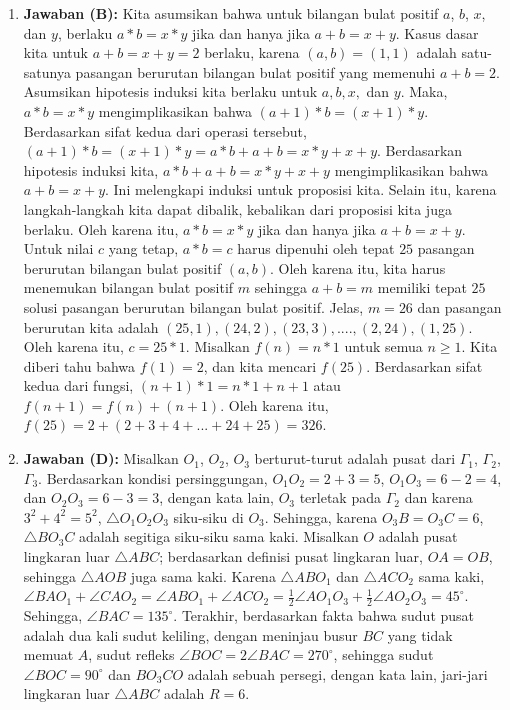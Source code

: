 \documentclass[12pt]{scrartcl}
\begin{document}
\begin{enumerate}
\item \textbf{Jawaban (B):} Kita asumsikan bahwa untuk bilangan bulat positif $a$, $b$, $x$, dan $y$, berlaku $a*b=x*y$ jika dan hanya jika $a+b=x+y$. Kasus dasar kita untuk $a+b=x+y=2$ berlaku, karena $(a,b)=(1,1)$ adalah satu-satunya pasangan berurutan bilangan bulat positif yang memenuhi $a+b=2$. Asumsikan hipotesis induksi kita berlaku untuk $a,b,x,$ dan $y$. Maka, $a*b=x*y$ mengimplikasikan bahwa $(a+1)*b=(x+1)*y$. Berdasarkan sifat kedua dari operasi tersebut, $(a+1)*b=(x+1)*y=a*b+a+b=x*y+x+y$. Berdasarkan hipotesis induksi kita, $a*b+a+b=x*y+x+y$ mengimplikasikan bahwa $a+b=x+y$. Ini melengkapi induksi untuk proposisi kita. Selain itu, karena langkah-langkah kita dapat dibalik, kebalikan dari proposisi kita juga berlaku. Oleh karena itu, $a*b=x*y$ jika dan hanya jika $a+b=x+y$. Untuk nilai $c$ yang tetap, $a*b=c$ harus dipenuhi oleh tepat $25$ pasangan berurutan bilangan bulat positif $(a, b)$. Oleh karena itu, kita harus menemukan bilangan bulat positif $m$ sehingga $a+b=m$ memiliki tepat $25$ solusi pasangan berurutan bilangan bulat positif. Jelas, $m=26$ dan pasangan berurutan kita adalah $(25,1), (24, 2), (23, 3), ...., (2, 24), (1, 25)$. Oleh karena itu, $c=25*1$. Misalkan $f(n)=n*1$ untuk semua $n\ge1$. Kita diberi tahu bahwa $f(1)=2$, dan kita mencari $f(25)$. Berdasarkan sifat kedua dari fungsi, $(n+1)*1=n*1+n+1$ atau $f(n+1)=f(n)+(n+1)$. Oleh karena itu, $f(25)=2+(2+3+4+...+24+25)=326$.

\item \textbf{Jawaban (D):} Misalkan $O_{1}$, $O_{2}$, $O_{3}$ berturut-turut adalah pusat dari $\Gamma_{1}$, $\Gamma_{2}$, $\Gamma_{3}$. Berdasarkan kondisi persinggungan, $O_{1}O_{2}=2+3=5$, $O_{1}O_{3}=6-2=4$, dan $O_{2}O_{3}=6-3=3$, dengan kata lain, $O_{3}$ terletak pada $\Gamma_{2}$ dan karena $3^{2}+4^{2}=5^{2}$, $\triangle O_{1}O_{2}O_{3}$ siku-siku di $O_{3}$. Sehingga, karena $O_{3}B=O_{3}C=6$, $\triangle BO_{3}C$ adalah segitiga siku-siku sama kaki. Misalkan $O$ adalah pusat lingkaran luar $\triangle ABC$; berdasarkan definisi pusat lingkaran luar, $OA=OB$, sehingga $\triangle AOB$ juga sama kaki. Karena $\triangle ABO_{1}$ dan $\triangle ACO_{2}$ sama kaki, $\angle BAO_{1}+\angle CAO_{2}=\angle ABO_{1}+\angle ACO_{2}=\frac{1}{2}\angle AO_{1}O_{3}+\frac{1}{2}\angle AO_{2}O_{3}=45^{\circ}$. Sehingga, $\angle BAC=135^{\circ}$. Terakhir, berdasarkan fakta bahwa sudut pusat adalah dua kali sudut keliling, dengan meninjau busur $BC$ yang tidak memuat $A$, sudut refleks $\angle BOC=2\angle BAC=270^{\circ}$, sehingga sudut $\angle BOC=90^{\circ}$ dan $BO_{3}CO$ adalah sebuah persegi, dengan kata lain, jari-jari lingkaran luar $\triangle ABC$ adalah $R=6$.


\end{enumerate}
\end{document}
